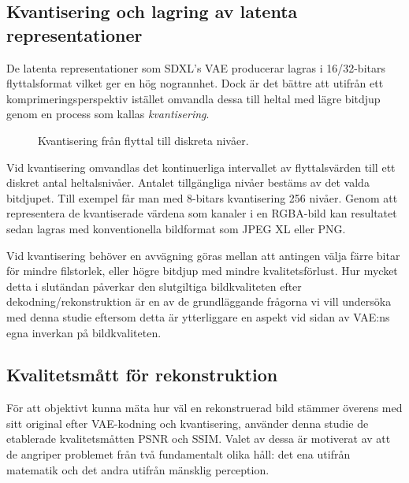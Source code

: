 \subsection*{Kvantisering och lagring av latenta representationer}
De latenta representationer som SDXL's VAE producerar lagras i 16/32-bitars flyttalsformat vilket ger en hög nogrannhet. Dock är det bättre att utifrån ett komprimeringsperspektiv istället omvandla dessa till heltal med lägre bitdjup genom en process som kallas \textit{kvantisering}.
\begin{figure}[htbp]
  \centering
  \resizebox{0.5\textwidth}{!}{}
  \caption{Kvantisering från flyttal till  diskreta nivåer.}
  \label{fig:quantization}
\end{figure}
Vid kvantisering omvandlas det kontinuerliga intervallet av flyttalsvärden till ett diskret antal heltalsnivåer. Antalet tillgängliga nivåer bestäms av det valda bitdjupet. Till exempel får man med 8-bitars kvantisering 256 nivåer. Genom att representera de kvantiserade värdena som kanaler i en RGBA-bild kan resultatet sedan lagras med konventionella bildformat som JPEG XL eller PNG. %



 Vid kvantisering behöver en avvägning göras mellan att antingen välja färre bitar för mindre filstorlek, eller högre bitdjup med mindre kvalitetsförlust. Hur mycket detta i slutändan påverkar den slutgiltiga bildkvaliteten efter dekodning/rekonstruktion är en av de grundläggande frågorna vi vill undersöka med denna studie eftersom detta är ytterliggare en aspekt vid sidan av VAE:ns egna inverkan på bildkvaliteten.

\subsection*{Kvalitetsmått för rekonstruktion}


För att objektivt kunna mäta hur väl en rekonstruerad bild stämmer överens med sitt original efter VAE-kodning och kvantisering, använder denna studie de etablerade kvalitetsmåtten PSNR och SSIM. Valet av dessa är motiverat av att de angriper problemet från två fundamentalt olika håll: det ena utifrån matematik och det andra utifrån mänsklig perception.

